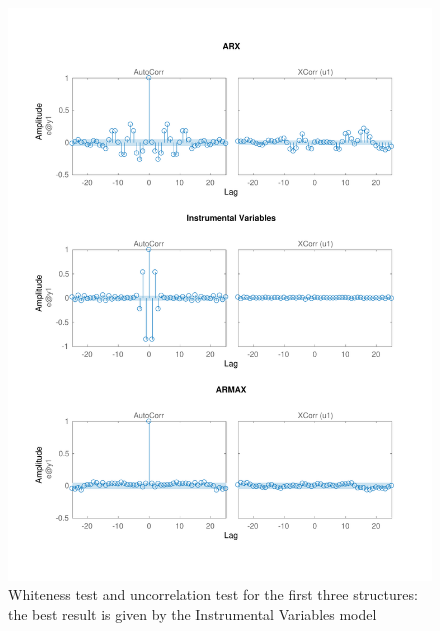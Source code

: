 \documentclass[a4paper,11pt]{article}
\begin{document}
\begin{figure}[H]
\centering
\includegraphics[width = 16cm]{images/4_resid_1}
\caption{Whiteness test and uncorrelation test for the first three structures: the best result is given by the Instrumental Variables model}
\label{fig:sys_res1}
\end{figure}
\end{document}
